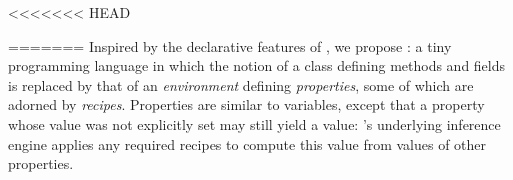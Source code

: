 <<<<<<< HEAD
% 
% 
% 
%    
% 
% 


=======
Inspired by the declarative features of , we propose \Reap: a tiny
programming language in which the notion of a class defining methods and fields
is replaced by that of an \emph{environment} defining \emph{properties}, some
of which are adorned by \emph{recipes}.  Properties are similar to variables,
   except that a property whose value was not explicitly set may still yield a
   value: \Reap's underlying inference engine applies any required recipes to
   compute this value from values of other properties. 

